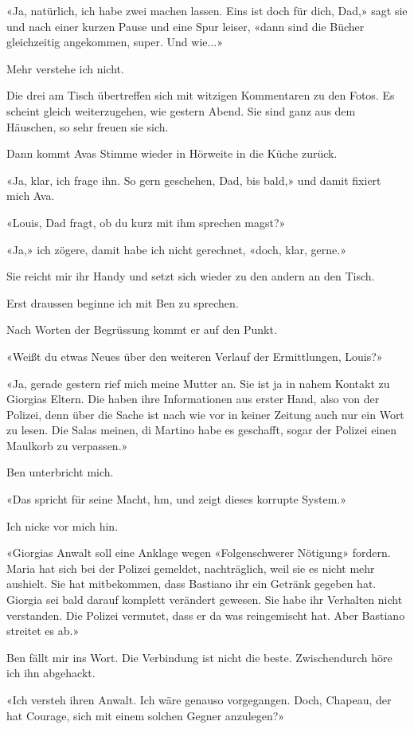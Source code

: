 «Ja, natürlich, ich habe zwei machen lassen. Eins ist doch für dich,
Dad,» sagt sie und nach einer kurzen Pause und eine Spur leiser, «dann
sind die Bücher gleichzeitig angekommen, super. Und wie...»

Mehr verstehe ich nicht.

Die drei am Tisch übertreffen sich mit witzigen Kommentaren zu den
Fotos. Es scheint gleich weiterzugehen, wie gestern Abend. Sie sind ganz
aus dem Häuschen, so sehr freuen sie sich.

Dann kommt Avas Stimme wieder in Hörweite in die Küche zurück.

«Ja, klar, ich frage ihn. So gern geschehen, Dad, bis bald,» und damit
fixiert mich Ava.

«Louis, Dad fragt, ob du kurz mit ihm sprechen magst?»

«Ja,» ich zögere, damit habe ich nicht gerechnet, «doch, klar, gerne.»

Sie reicht mir ihr Handy und setzt sich wieder zu den andern an den
Tisch.

Erst draussen beginne ich mit Ben zu sprechen.

Nach Worten der Begrüssung kommt er auf den Punkt.

«Weißt du etwas Neues über den weiteren Verlauf der Ermittlungen,
Louis?»

«Ja, gerade gestern rief mich meine Mutter an. Sie ist ja in nahem
Kontakt zu Giorgias Eltern. Die haben ihre Informationen aus erster
Hand, also von der Polizei, denn über die Sache ist nach wie vor in
keiner Zeitung auch nur ein Wort zu lesen. Die Salas meinen, di Martino
habe es geschafft, sogar der Polizei einen Maulkorb zu verpassen.»

Ben unterbricht mich.

«Das spricht für seine Macht, hm, und zeigt dieses korrupte System.»

Ich nicke vor mich hin.

«Giorgias Anwalt soll eine Anklage wegen «Folgenschwerer Nötigung»
fordern. Maria hat sich bei der Polizei gemeldet, nachträglich, weil sie
es nicht mehr aushielt. Sie hat mitbekommen, dass Bastiano ihr ein
Getränk gegeben hat. Giorgia sei bald darauf komplett verändert gewesen.
Sie habe ihr Verhalten nicht verstanden. Die Polizei vermutet, dass er
da was reingemischt hat. Aber Bastiano streitet es ab.»

Ben fällt mir ins Wort. Die Verbindung ist nicht die beste.
Zwischendurch höre ich ihn abgehackt.

«Ich versteh ihren Anwalt. Ich wäre genauso vorgegangen. Doch, Chapeau,
der hat Courage, sich mit einem solchen Gegner anzulegen?»

